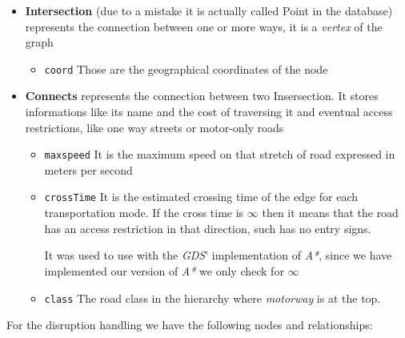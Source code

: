 \begin{itemize}
	\item \textbf{Intersection }(due to a mistake it is actually called Point 
	in the database) represents the connection between one or more ways, it is 
	a \textit{vertex} of the graph
	
	
	
	\begin{itemize}
		\item \texttt{coord} Those are the geographical coordinates of the 
		node
	\end{itemize}
	
	\item \textbf{Connects} represents the connection between two Insersection. 
	It stores informations like its name and the cost of traversing it and 
	eventual access restrictions, like one way streets or motor-only roads
	
	
	
	\begin{itemize}
		\item \texttt{maxspeed} It is the maximum speed on that stretch of road 
		expressed in meters per second
		
		\item \texttt{crossTime} It is the estimated crossing time of the edge 
		for each transportation mode. If the cross time is $\infty
		$ then it means 
		that the road has an access restriction in that direction, such has no 
		entry signs.
		
		It was used to use with the \textit{GDS}' implementation of 
		\textit{A*}, since we have implemented our version of \textit{A*} we 
		only check for $\infty$
		
		\item \texttt{class} The road class in the hierarchy where 
		\textit{motorway} is at the top.
	\end{itemize}
	
\end{itemize}

For the disruption handling we have the following nodes and relationships:

